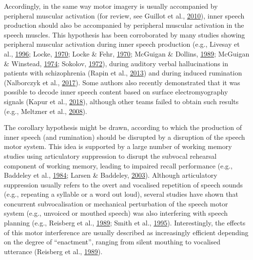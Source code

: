 \documentclass[a4paper,12pt,twoside,onecolumn,openright,final,oldfontcommands]{memoir}
\begin{document}
Accordingly, in the same way motor imagery is usually accompanied by peripheral muscular activation (for review, see Guillot et al., \protect\hyperlink{ref-guillot_electromyographic_2010}{2010}), inner speech production should also be accompanied by peripheral muscular activation in the speech muscles. This hypothesis has been corroborated by many studies showing peripheral muscular activation during inner speech production (e.g., Livesay et al., \protect\hyperlink{ref-livesay_covert_1996}{1996}; Locke, \protect\hyperlink{ref-locke_subvocal_1970-1}{1970}; Locke \& Fehr, \protect\hyperlink{ref-locke_subvocal_1970}{1970}; McGuigan \& Dollins, \protect\hyperlink{ref-mcguigan_patterns_1989}{1989}; McGuigan \& Winstead, \protect\hyperlink{ref-mcguigan_discriminative_1974}{1974}; Sokolov, \protect\hyperlink{ref-sokolov_inner_1972}{1972}), during auditory verbal hallucinations in patients with schizophrenia (Rapin et al., \protect\hyperlink{ref-Rapin2013}{2013}) and during induced rumination (Nalborczyk et al., \protect\hyperlink{ref-nalborczyk_orofacial_2017}{2017}). Some authors also recently demonstrated that it was possible to decode inner speech content based on surface electromyography signals (Kapur et al., \protect\hyperlink{ref-kapur_alterego_2018}{2018}), although other teams failed to obtain such results (e.g., Meltzner et al., \protect\hyperlink{ref-meltzner_speech_2008}{2008}).

The corollary hypothesis might be drawn, according to which the production of inner speech (and rumination) should be disrupted by a disruption of the speech motor system. This idea is supported by a large number of working memory studies using articulatory suppression to disrupt the subvocal rehearsal component of working memory, leading to impaired recall performance (e.g., Baddeley et al., \protect\hyperlink{ref-baddeley_exploring_1984}{1984}; Larsen \& Baddeley, \protect\hyperlink{ref-larsen_disruption_2003}{2003}). Although articulatory suppression usually refers to the overt and vocalised repetition of speech sounds (e.g., repeating a syllable or a word out loud), several studies have shown that concurrent subvocalisation or mechanical perturbation of the speech motor system (e.g., unvoiced or mouthed speech) was also interfering with speech planning (e.g., Reisberg et al., \protect\hyperlink{ref-reisberg_enacted_1989}{1989}; Smith et al., \protect\hyperlink{ref-smith_role_1995}{1995}). Interestingly, the effects of this motor interference are usually described as increasingly efficient depending on the degree of \enquote{enactment}, ranging from silent mouthing to vocalised utterance (Reisberg et al., \protect\hyperlink{ref-reisberg_enacted_1989}{1989}).
\end{document}
